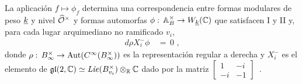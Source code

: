 %

\begin{propoFormasModularesComoFormasAutomorfas}%
	\label{thm:formasmodularescomoformasautomorfas}
	La aplicaci\'{o}n $f\mapsto\phi_{f}$ determina una correspondencia
	entre formas modulares de peso $\underline{k}$ y nivel $\widehat{\mathcal{O}}^{\times}$
	y formas automorfas
	\begin{math}
		\phi:\,\mathbb{A}_{B}^{\times}\rightarrow W_{\underline{k}}(\mathbb{C})
	\end{math}
	que satisfacen \textrm{I} y \textrm{II} y, para cada lugar arquimediano
	no ramificado $v_{i}$,
	\begin{align*}
		d\rho X^{-}_{i}\phi & \,=\, 0
		\text{ ,}
	\end{align*}
	donde
	\begin{math}
		\rho:\,{B}_{\infty}^{\times}\rightarrow\mathrm{Aut}(C^{\infty}({B}_{\infty}^{\times}))
	\end{math}
	es la representaci\'{o}n regular a derecha y $X^{-}_{i}$ es el
	elemento de
	\begin{math}
		\mathfrak{gl}(2,\mathbb{C})\simeq
			\mathit{Lie}(B_{v_{i}}^{\times})\otimes_{\mathbb{R}}\mathbb{C}
	\end{math}
	dado por la matriz
	\begin{math}
		\begin{bmatrix} 1 & -i \\ -i & -1 \end{bmatrix}
	\end{math}~.
\end{propoFormasModularesComoFormasAutomorfas}

